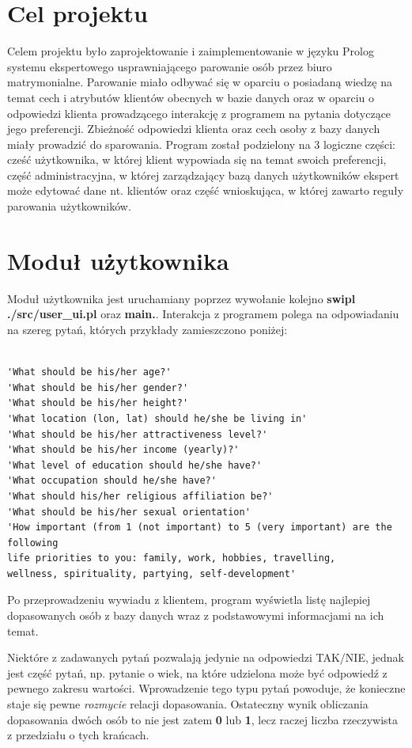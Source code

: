 \documentclass[12pt]{article}
\begin{document}
	\section{Cel projektu}
	Celem projektu było zaprojektowanie i zaimplementowanie w języku Prolog systemu ekspertowego usprawniającego parowanie osób przez biuro matrymonialne. Parowanie miało odbywać się w oparciu o posiadaną wiedzę na temat cech i atrybutów klientów obecnych w bazie danych oraz w oparciu o odpowiedzi klienta prowadzącego interakcję z programem na pytania dotyczące jego preferencji. Zbieżność odpowiedzi klienta oraz cech osoby z bazy danych miały prowadzić do sparowania. Program został podzielony na 3 logiczne części: cześć użytkownika, w której klient wypowiada się na temat swoich preferencji, część administracyjna, w której zarządzający bazą danych użytkowników ekspert może edytować dane nt. klientów oraz część wnioskująca, w której zawarto reguły parowania użytkowników.
	\section{Moduł użytkownika}
Moduł użytkownika jest uruchamiany poprzez wywołanie kolejno \textbf{swipl ./src/user\_ui.pl} oraz \textbf{main.}.
Interakcja z programem polega na odpowiadaniu na szereg pytań, których przykłady zamieszczono poniżej:
	\begin{verbatim}
	
'What should be his/her age?'
'What should be his/her gender?'
'What should be his/her height?'
'What location (lon, lat) should he/she be living in'
'What should be his/her attractiveness level?'
'What should be his/her income (yearly)?'
'What level of education should he/she have?'
'What occupation should he/she have?'
'What should his/her religious affiliation be?'
'What should be his/her sexual orientation'
'How important (from 1 (not important) to 5 (very important) are the following 
life priorities to you: family, work, hobbies, travelling,
wellness, spirituality, partying, self-development'
	\end{verbatim}

Po przeprowadzeniu wywiadu z klientem, program wyświetla listę najlepiej dopasowanych osób z bazy danych wraz z podstawowymi informacjami na ich temat.
	
Niektóre z zadawanych pytań pozwalają jedynie na odpowiedzi TAK/NIE, jednak jest część pytań, np. pytanie o wiek, na które udzielona może być odpowiedź z pewnego zakresu wartości. Wprowadzenie tego typu pytań powoduje, że konieczne staje się pewne \textit{rozmycie} relacji dopasowania. Ostateczny wynik obliczania dopasowania dwóch osób to nie jest zatem \textbf{0} lub \textbf{1}, lecz raczej liczba rzeczywista z przedziału o tych krańcach.
\newpage
\end{document}

